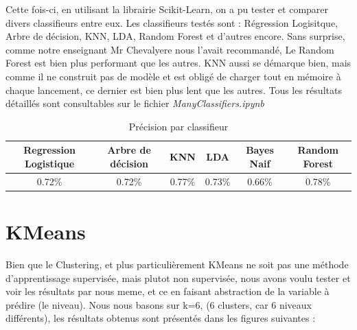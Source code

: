 \documentclass[11pt]{article}
\begin{document}
Cette fois-ci, en utilisant la librairie Scikit-Learn, on a pu tester et comparer divers classifieurs entre eux. \newline
Les classifieurs testés sont : Régression Logisitque, Arbre de décision, KNN, LDA, Random Forest et d'autres encore. \newline  \newline
Sans surprise, comme notre enseignant Mr Chevalyere nous l'avait recommandé, Le Random Forest est bien plus performant que les autres. \newline   \newline
KNN aussi se démarque bien, mais comme il ne construit pas de modèle et est obligé de charger tout en mémoire à chaque lancement, ce dernier est bien plus lent que les autres. \newline\newline
Tous les résultats détaillés sont consultables sur le fichier \textit{ManyClassifiers.ipynb}


\begin{table}[h!]
  \begin{center}
    \caption{Précision par classifieur}
    \label{tab:table}
    \begin{tabular}{c c c c c c} %
      \textbf{Regression Logistique} & \textbf{Arbre de décision} & \textbf{KNN}   & \textbf{LDA}  & \textbf{Bayes Naif}  & \textbf{Random Forest}\\
      \hline
       0.72\% & 0.72\%  & 0.77\% & 0.73\% &  0.66\% & 0.78\% \\ 
    \end{tabular}
  \end{center}
\end{table}


\section{KMeans}

Bien que le Clustering, et plus particulièrement KMeans ne soit pas une méthode d'apprentissage supervisée, mais plutot non supervisée, nous avons voulu tester et voir les résultats par nous meme, et ce en faisant abstraction de la variable à prédire (le niveau). \newline \newline
Nous nous basons sur k=6, (6 clusters, car 6 niveaux différents),  les résultats obtenus sont présentés dans les figures suivantes : \newline
\end{document}
